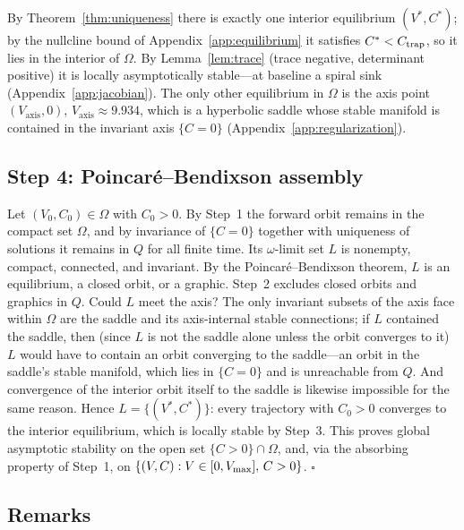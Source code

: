 By Theorem~\ref{thm:uniqueness} there is exactly one interior equilibrium
$(V^{*},C^{*})$; by the nullcline bound of Appendix~\ref{app:equilibrium}
it satisfies $C^{*}<C_{\mathrm{trap}}$, so it lies in the interior of $\Omega$. By
Lemma~\ref{lem:trace} (trace negative, determinant positive) it is locally
asymptotically stable---at baseline a spiral sink
(Appendix~\ref{app:jacobian}). The only other equilibrium in $\Omega$ is
the axis point $(V_{\mathrm{axis}},0)$, $V_{\mathrm{axis}}\approx9.934$,
which is a hyperbolic saddle whose stable manifold is contained in the
invariant axis $\{C=0\}$ (Appendix~\ref{app:regularization}).

\subsection{Step 4: Poincar\'e--Bendixson assembly}

Let $(V_0,C_0)\in\Omega$ with $C_0>0$. By Step~1 the forward orbit remains
in the compact set $\Omega$, and by invariance of $\{C=0\}$ together with
uniqueness of solutions it remains in $Q$ for all finite time. Its
$\omega$-limit set $L$ is nonempty, compact, connected, and invariant. By
the Poincar\'e--Bendixson theorem, $L$ is an equilibrium, a closed orbit,
or a graphic. Step~2 excludes closed orbits and graphics in $Q$. Could $L$
meet the axis? The only invariant subsets of the axis face within $\Omega$
are the saddle and its axis-internal stable connections; if $L$ contained
the saddle, then (since $L$ is not the saddle alone unless the orbit
converges to it) $L$ would have to contain an orbit converging to the
saddle---an orbit in the saddle's stable manifold, which lies in
$\{C=0\}$ and is unreachable from $Q$. And convergence of the interior
orbit itself to the saddle is likewise impossible for the same reason.
Hence $L=\{(V^{*},C^{*})\}$: every trajectory with $C_0>0$ converges to
the interior equilibrium, which is locally stable by Step~3. This proves
global asymptotic stability on the open set $\{C>0\}\cap\Omega$, and, via
the absorbing property of Step~1, on
$\{(V,C):V\in[0,V_{\max}],\,C>0\}$. \hfill$\square$

\subsection{Remarks}

